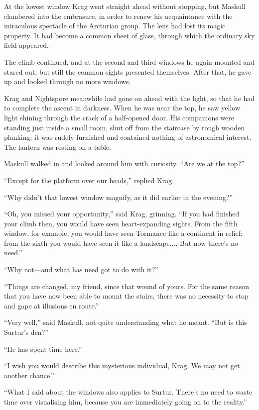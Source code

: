 At the lowest window Krag went straight ahead without stopping, but Maskull clambered into the embrasure, in order to renew his acquaintance with the miraculous spectacle of the Arcturian group. The lens had lost its magic property. It had become a common sheet of glass, through which the ordinary sky field appeared.

The climb continued, and at the second and third windows he again mounted and stared out, but still the common sights presented themselves. After that, he gave up and looked through no more windows.

Krag and Nightspore meanwhile had gone on ahead with the light, so that he had to complete the ascent in darkness. When he was near the top, he saw yellow light shining through the crack of a half-opened door. His companions were standing just inside a small room, shut off from the staircase by rough wooden planking; it was rudely furnished and contained nothing of astronomical interest. The lantern was resting on a table.

Maskull walked in and looked around him with curiosity. ``Are we at the top?''

``Except for the platform over our heads,'' replied Krag.

``Why didn't that lowest window magnify, as it did earlier in the evening?''

``Oh, you missed your opportunity,'' said Krag, grinning. ``If you had finished your climb then, you would have seen heart-expanding sights. From the fifth window, for example, you would have seen Tormance like a continent in relief; from the sixth you would have seen it like a landscape.... But now there's no need.''

``Why not—and what has need got to do with it?''

``Things are changed, my friend, since that wound of yours. For the same reason that you have now been able to mount the stairs, there was no necessity to stop and gape at illusions en route.''

``Very well,'' said Maskull, not quite understanding what he meant. ``But is this Surtur's den?''

``He has spent time here.''

``I wish you would describe this mysterious individual, Krag. We may not get another chance.''

``What I said about the windows also applies to Surtur. There's no need to waste time over visualising him, because you are immediately going on to the reality.''

